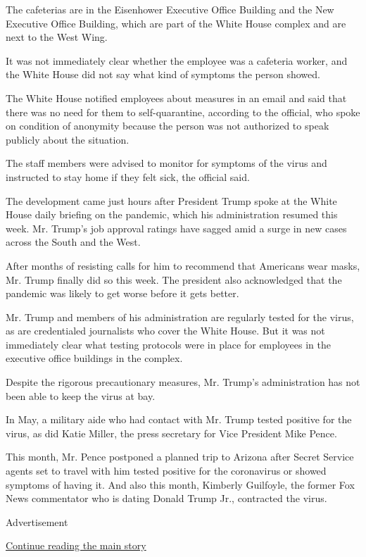 The cafeterias are in the Eisenhower Executive Office Building and the
New Executive Office Building, which are part of the White House complex
and are next to the West Wing.

It was not immediately clear whether the employee was a cafeteria
worker, and the White House did not say what kind of symptoms the person
showed.

The White House notified employees about measures in an email and said
that there was no need for them to self-quarantine, according to the
official, who spoke on condition of anonymity because the person was not
authorized to speak publicly about the situation.

The staff members were advised to monitor for symptoms of the virus and
instructed to stay home if they felt sick, the official said.

The development came just hours after President Trump spoke at the White
House daily briefing on the pandemic, which his administration resumed
this week. Mr. Trump's job approval ratings have sagged amid a surge in
new cases across the South and the West.

After months of resisting calls for him to recommend that Americans wear
masks, Mr. Trump finally did so this week. The president also
acknowledged that the pandemic was likely to get worse before it gets
better.

Mr. Trump and members of his administration are regularly tested for the
virus, as are credentialed journalists who cover the White House. But it
was not immediately clear what testing protocols were in place for
employees in the executive office buildings in the complex.

Despite the rigorous precautionary measures, Mr. Trump's administration
has not been able to keep the virus at bay.

In May, a military aide who had contact with Mr. Trump tested positive
for the virus, as did Katie Miller, the press secretary for Vice
President Mike Pence.

This month, Mr. Pence postponed a planned trip to Arizona after Secret
Service agents set to travel with him tested positive for the
coronavirus or showed symptoms of having it. And also this month,
Kimberly Guilfoyle, the former Fox News commentator who is dating Donald
Trump Jr., contracted the virus.

Advertisement

\protect\hyperlink{after-bottom}{Continue reading the main story}

